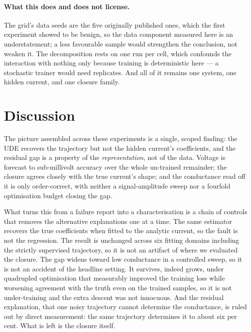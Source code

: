 \documentclass{article}
\begin{document}
\paragraph{What this does and does not license.}
The grid's data seeds are the five originally published ones, which the first
experiment showed to be benign, so the data component measured here is an
understatement; a less favourable sample would strengthen the conclusion, not
weaken it. The decomposition rests on one run per cell, which confounds the
interaction with nothing only because training is deterministic here --- a
stochastic trainer would need replicates. And all of it remains one system, one
hidden current, and one closure family.

\section{Discussion}
\label{sec:discussion}

The picture assembled across these experiments is a single, scoped finding: the
UDE recovers the trajectory but not the hidden current's coefficients, and the
residual gap is a property of the \emph{representation}, not of the data.
Voltage is forecast to sub-millivolt accuracy over the whole un-trained
remainder; the closure agrees closely with the true current's shape; and the
conductance read off it is only order-correct, with neither a signal-amplitude
sweep nor a fourfold optimisation budget closing the gap.

What turns this from a failure report into a characterisation is a chain of
controls that removes the alternative explanations one at a time. The same
estimator recovers the true coefficients when fitted to the analytic current, so
the fault is not the regression. The result is unchanged across six fitting
domains including the strictly supervised trajectory, so it is not an artifact of
where we evaluated the closure. The gap widens toward low conductance in a
controlled sweep, so it is not an accident of the headline setting. It survives,
indeed grows, under quadrupled optimisation that measurably improved the training
loss while worsening agreement with the truth even on the trained samples, so it
is not under-training and the extra descent was not innocuous. And the residual explanation, that one noisy
trajectory cannot determine the conductance, is ruled out by direct measurement:
the same trajectory determines it to about six per cent. What is left is the
closure itself.
\end{document}
